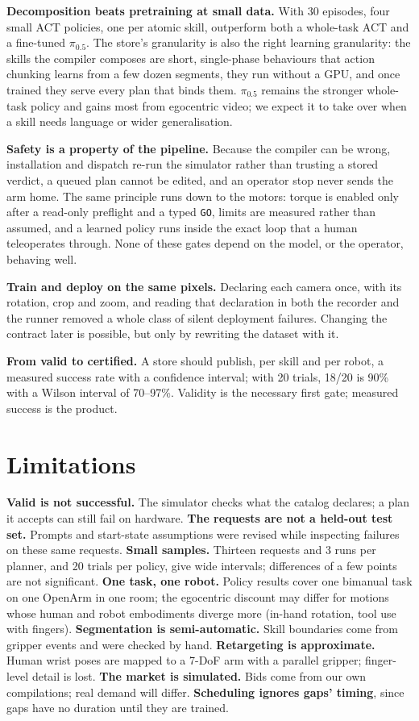 \documentclass[10pt,twocolumn,letterpaper]{article}
\newcommand{\code}[1]{\texttt{\small #1}}
\begin{document}
\textbf{Decomposition beats pretraining at small data.} With 30 episodes, four small ACT policies, one per atomic
skill, outperform both a whole-task ACT and a fine-tuned $\pi_{0.5}$. The store's granularity is also the right
learning granularity: the skills the compiler composes are short, single-phase behaviours that action chunking learns
from a few dozen segments, they run without a GPU, and once trained they serve every plan that binds them. $\pi_{0.5}$
remains the stronger whole-task policy and gains most from egocentric video; we expect it to take over when a skill
needs language or wider generalisation.

\textbf{Safety is a property of the pipeline.} Because the compiler can be wrong, installation and dispatch re-run the
simulator rather than trusting a stored verdict, a queued plan cannot be edited, and an operator stop never sends the arm
home. The same principle runs down to the motors: torque is enabled only after a read-only preflight and a typed
\code{GO}, limits are measured rather than assumed, and a learned policy runs inside the exact loop that a human
teleoperates through. None of these gates depend on the model, or the operator, behaving well.

\textbf{Train and deploy on the same pixels.} Declaring each camera once, with its rotation, crop and zoom, and reading
that declaration in both the recorder and the runner removed a whole class of silent deployment failures. Changing the
contract later is possible, but only by rewriting the dataset with it.

\textbf{From valid to certified.} A store should publish, per skill and per robot, a measured success rate with a
confidence interval; with 20 trials, 18/20 is 90\% with a Wilson interval of 70--97\%. Validity is the necessary first
gate; measured success is the product.

\section{Limitations}
\textbf{Valid is not successful.} The simulator checks what the catalog declares; a plan it accepts can still fail on
hardware. \textbf{The requests are not a held-out test set.} Prompts and start-state assumptions were revised while
inspecting failures on these same requests. \textbf{Small samples.} Thirteen requests and 3 runs per planner, and 20
trials per policy, give wide intervals; differences of a few points are not significant. \textbf{One task, one
robot.} Policy results cover one bimanual task on one OpenArm in one room; the egocentric discount may differ for
motions whose human and robot embodiments diverge more (in-hand rotation, tool use with fingers). \textbf{Segmentation is
semi-automatic.} Skill boundaries come from gripper events and were checked by hand. \textbf{Retargeting
is approximate.} Human wrist poses are mapped to a 7-DoF arm with a parallel gripper; finger-level detail is lost.
\textbf{The market is simulated.} Bids come from our own compilations; real demand will differ. \textbf{Scheduling
ignores gaps' timing}, since gaps have no duration until they are trained.
\end{document}
